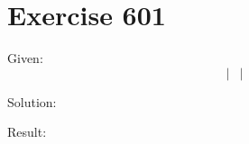 \documentclass[a4paper, 10pt]{scrartcl}
\begin{document}
\section{Exercise 601}

Given:
\[
\left|
    \begin{array}{ccc}
    \end{array}
\right|
\]

Solution:

Result:
\end{document}
